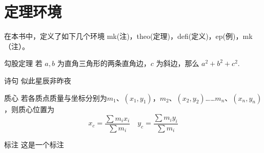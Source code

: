 \documentclass{gbook}
\begin{document}
\section{定理环境}

在本书中，定义了如下几个环境
mk(注)，theo(定理)，defi(定义)，ep(例)，mk（注）。

\begin{theo}{勾股定理}{}
若 $a,b$ 为直角三角形的两条直角边，$c$ 为斜边，那么 $a^2 + b^2 + c^2.$
\end{theo}

\begin{ep}{诗句}{}
似此星辰非昨夜
\end{ep}

\begin{defi}{质心}{}
若各质点质量与坐标分别为$m_1$、$(x_1,y_1)$，$m_2$、$(x_2,y_2)$……$m_n$、$(x_n,y_n)$，则质心位置为
$$x_c = \frac{\sum m_i x_i}{\sum m_i} \quad y_c = \frac{\sum m_i y_i}{\sum m_i}$$
\end{defi}

\begin{mk}{标注}{}
这是一个标注
\end{mk}
\end{document}
